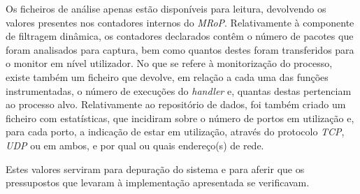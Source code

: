 Os ficheiros de análise apenas estão disponíveis para leitura, devolvendo os valores presentes nos contadores internos do \textit{MRoP}.
Relativamente à componente de filtragem dinâmica, os contadores declarados contêm o número de pacotes que foram analisados para captura, bem como quantos destes foram transferidos para o monitor em nível utilizador.
No que se refere à monitorização do processo, existe também um ficheiro que devolve, em relação a cada uma das funções instrumentadas, o número de execuções do \textit{handler} e, quantas destas pertenciam ao processo alvo.
Relativamente ao repositório de dados, foi também criado um ficheiro com estatísticas, que incidiram sobre o número de portos em utilização e, para cada porto, a indicação de estar em utilização, através do protocolo \textit{TCP}, \textit{UDP} ou em ambos, e por qual ou quais endereço(s) de rede.

Estes valores serviram para depuração do sistema e para aferir que os pressupostos que levaram à implementação apresentada se verificavam.









